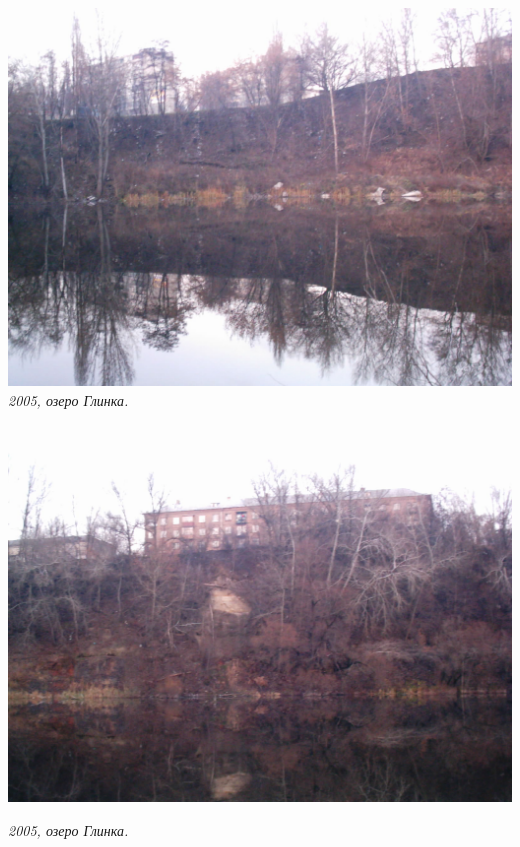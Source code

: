 \begin{center}
\includegraphics[width=\linewidth]{pix/glinka-imag0022.jpg}
\textit{2005, озеро Глинка.}
\end{center} 

\begin{center}
\includegraphics[width=\linewidth]{pix/glinka-imag0018.jpg}

\textit{2005, озеро Глинка.}
\end{center} 
\newpage

